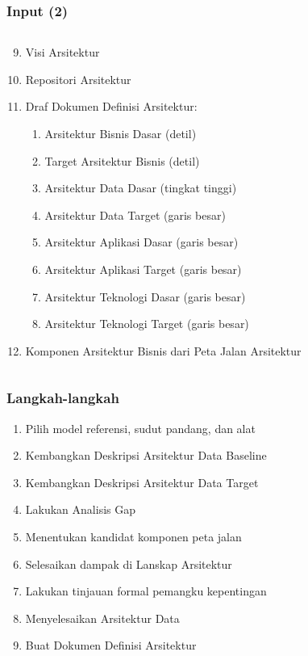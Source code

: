 \documentclass[aspectratio=169, table]{beamer}
\begin{document}
	
	\begin{frame}
		\frametitle{Input (2)}
		\begin{columns}
			
			\begin{column}{1\textwidth}
				\begin{center}
					\begin{enumerate}
						\setcounter{enumi}{8}
						\item Visi Arsitektur
						\item Repositori Arsitektur
						\item Draf Dokumen Definisi Arsitektur:
						\begin{enumerate}
							\item Arsitektur Bisnis Dasar (detil)
							\item Target Arsitektur Bisnis (detil)
							\item Arsitektur Data Dasar (tingkat tinggi)
							\item Arsitektur Data Target (garis besar)
							\item Arsitektur Aplikasi Dasar (garis besar)
							\item Arsitektur Aplikasi Target (garis besar)
							\item Arsitektur Teknologi Dasar (garis besar)
							\item Arsitektur Teknologi Target (garis besar)
						\end{enumerate}
						\item Komponen Arsitektur Bisnis dari Peta Jalan Arsitektur
					\end{enumerate}
				\end{center}
			\end{column}
		\end{columns}
	\end{frame}
	
	
	\begin{frame}
		\frametitle{Langkah-langkah}
		\begin{enumerate}
			\item Pilih model referensi, sudut pandang, dan alat
			\item Kembangkan Deskripsi Arsitektur Data Baseline
			\item Kembangkan Deskripsi Arsitektur Data Target
			\item Lakukan Analisis Gap
			\item Menentukan kandidat komponen peta jalan
			\item Selesaikan dampak di Lanskap Arsitektur
			\item Lakukan tinjauan formal pemangku kepentingan
			\item Menyelesaikan Arsitektur Data
			\item Buat Dokumen Definisi Arsitektur
		\end{enumerate}
	\end{frame}
	
\end{document}
